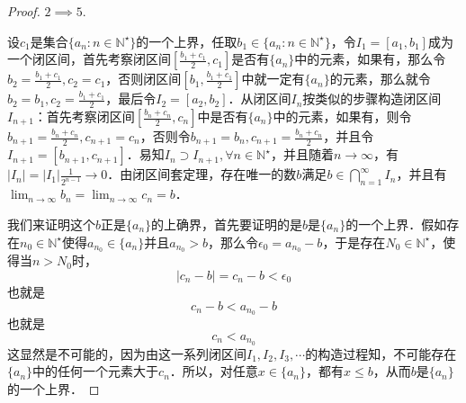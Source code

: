 \documentclass{ctexart}
\theoremstyle{definition}
\theoremstyle{definition}
\theoremstyle{plain}
\theoremstyle{plain}
\theoremstyle{plain}
\theoremstyle{definition}
\newcommand{\nat}{\mathbb{N}^\star}
\begin{document}
\begin{proof}
$2 \implies 5$.

\noindent 设$c_1$是集合$\{a_n:n\in\nat\}$的一个上界，任取$b_1 \in \{a_n:n\in\nat\}$，令$I_1 = [a_1, b_1]$成为一个闭区间，首先考察闭区间$[\displaystyle\frac{b_1+c_1}{2}, c_1]$是否有$\{a_n\}$中的元素，如果有，那么令$b_2 = \displaystyle \frac{b_1+c_1}{2}, c_2 = c_1$，否则闭区间$[b_1, \displaystyle\frac{b_1+c_1}{2}]$中就一定有$\{a_n\}$的元素，那么就令$b_2=b_1, c_2=\displaystyle\frac{b_1+c_1}{2}$，最后令$I_2 = [a_2, b_2]$．从闭区间$I_n$按类似的步骤构造闭区间$I_{n+1}$：首先考察闭区间$[\displaystyle\frac{b_n+c_n}{2},c_n]$中是否有$\{a_n\}$中的元素，如果有，则令$b_{n+1}=\displaystyle\frac{b_n+c_n}{2}, c_{n+1}=c_n$，否则令$b_{n+1}=b_n,c_{n+1}=\displaystyle\frac{b_n+c_n}{2}$，并且令$I_{n+1} = [b_{n+1},c_{n+1}]$．易知$I_n \supset I_{n+1}, \forall n \in \nat$，并且随着$n\to\infty$，有$|I_n| = |I_1|\displaystyle\frac{1}{2^{n-1}} \to 0$．由闭区间套定理，存在唯一的数$b$满足$b \in \displaystyle\bigcap_{n=1}^\infty I_n$，并且有$\displaystyle\lim_{n\to\infty}b_n=\lim_{n\to\infty}c_n=b$．

\noindent 我们来证明这个$b$正是$\{a_n\}$的上确界，首先要证明的是$b$是$\{a_n\}$的一个上界．假如存在$n_0 \in \nat$使得$a_{n_0} \in \{a_n\}$并且$a_{n_0} > b$，那么令$\epsilon_0 = a_{n_0}-b$，于是存在$N_0 \in \nat$，使得当$n > N_0$时，
\begin{equation}
    |c_n - b| = c_n - b < \epsilon_0
\end{equation}
也就是
\begin{equation}
    c_n - b < a_{n_0} - b
\end{equation}
也就是
\begin{equation}
    c_n < a_{n_0}
\end{equation}
这显然是不可能的，因为由这一系列闭区间$I_1,I_2,I_3,\cdots$的构造过程知，不可能存在$\{a_n\}$中的任何一个元素大于$c_n$．所以，对任意$x \in \{a_n\}$，都有$x \leq b$，从而$b$是$\{a_n\}$的一个上界．


\end{proof}
\end{document}
